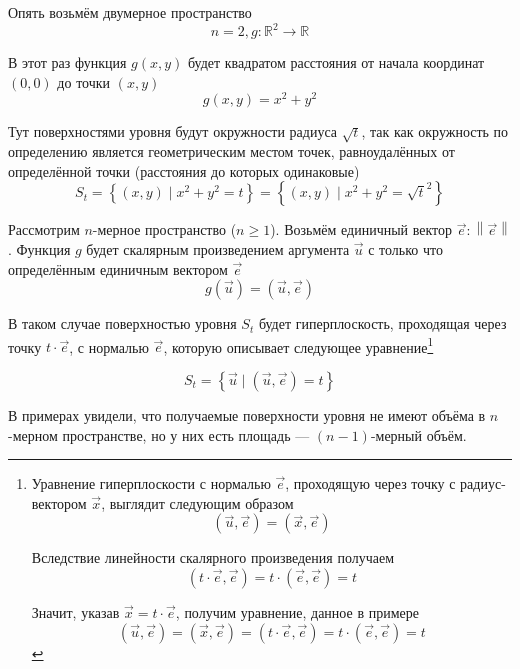 \begin{example}
    Опять возьмём двумерное пространство
    $$n=2, g: \mathbb{R}^2 \rightarrow \mathbb{R}$$

    В этот раз функция $g\left( x, y \right)$ будет квадратом расстояния
    от начала координат $\left( 0, 0 \right)$ до точки $\left( x, y \right)$
    $$g\left( x, y \right) = x^2 + y^2$$

    Тут поверхностями уровня будут окружности радиуса $\sqrt{t}$,
    так как окружность по определению является геометрическим местом точек,
    равноудалённых от определённой точки (расстояния до которых одинаковые)
    $$S_t
        = \left\{ \left( x, y \right) \mid x^2 + y^2 = t \right\}
        = \left\{ \left( x, y \right) \mid x^2 + y^2 = \sqrt{t}^2 \right\}$$
\end{example}

\begin{example}
    Рассмотрим $n$-мерное пространство ($n \ge 1$).
    Возьмём единичный вектор $\vec{e}: \left\| \vec{e} \right\|$.
    Функция $g$ будет скалярным произведением аргумента $\vec{u}$
    с только что определённым единичным вектором $\vec{e}$
        $$g\left( \vec{u} \right) = \left( \vec{u}, \vec{e} \right)$$

    В таком случае поверхностью уровня $S_t$ будет гиперплоскость,
    проходящая через точку $t \cdot \vec{e}$, с нормалью $\vec{e}$,
    которую описывает следующее уравнение\footnote{
        Уравнение гиперплоскости с нормалью $\vec{e}$,
        проходящую через точку с радиус-вектором $\vec{x}$,
        выглядит следующим образом
        $$\left( \vec{u}, \vec{e} \right) = \left( \vec{x}, \vec{e} \right)$$

        Вследствие линейности скалярного произведения получаем
        $$\left( t \cdot \vec{e}, \vec{e} \right)
            = t \cdot \left( \vec{e}, \vec{e} \right) = t$$

        Значит, указав $\vec{x} = t \cdot \vec{e}$, получим уравнение,
        данное в примере
        $$\left( \vec{u}, \vec{e} \right)
            = \left( \vec{x}, \vec{e} \right)
            = \left( t \cdot \vec{e}, \vec{e} \right)
            = t \cdot \left( \vec{e}, \vec{e} \right) = t$$}

    $$S_t = \left\{ \vec{u} \mid \left( \vec{u}, \vec{e} \right) = t \right\}$$
\end{example}

В примерах увидели, что получаемые поверхности уровня не имеют объёма
в $n$-мерном пространстве, но у них есть площадь --- $(n-1)$-мерный объём.

